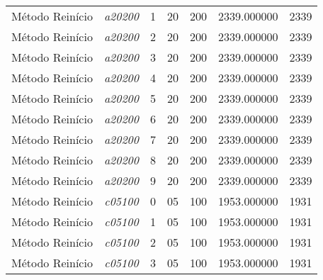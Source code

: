 {\begin{longtable}{cc|c|cc|cc}
			Método Reinício    & \textit{a20200}    & 1                               & 20               & 200              & 2339.000000                          & 2339 \\ 
			Método Reinício    & \textit{a20200}    & 2                               & 20               & 200              & 2339.000000                          & 2339 \\ 
			Método Reinício    & \textit{a20200}    & 3                               & 20               & 200              & 2339.000000                          & 2339 \\ 
			Método Reinício    & \textit{a20200}    & 4                               & 20               & 200              & 2339.000000                          & 2339 \\ 
			Método Reinício    & \textit{a20200}    & 5                               & 20               & 200              & 2339.000000                          & 2339 \\ 
			Método Reinício    & \textit{a20200}    & 6                               & 20               & 200              & 2339.000000                          & 2339 \\ 
			Método Reinício    & \textit{a20200}    & 7                               & 20               & 200              & 2339.000000                          & 2339 \\ 
			Método Reinício    & \textit{a20200}    & 8                               & 20               & 200              & 2339.000000                          & 2339 \\ 
			Método Reinício    & \textit{a20200}    & 9                               & 20               & 200              & 2339.000000                          & 2339 \\ \hline
			Método Reinício    & \textit{c05100}    & 0                               & 05               & 100              & 1953.000000                          & 1931 \\ 
			Método Reinício    & \textit{c05100}    & 1                               & 05               & 100              & 1953.000000                          & 1931 \\ 
			Método Reinício    & \textit{c05100}    & 2                               & 05               & 100              & 1953.000000                          & 1931 \\ 
			Método Reinício    & \textit{c05100}    & 3                               & 05               & 100              & 1953.000000                          & 1931 \\ 

\end{longtable}}
